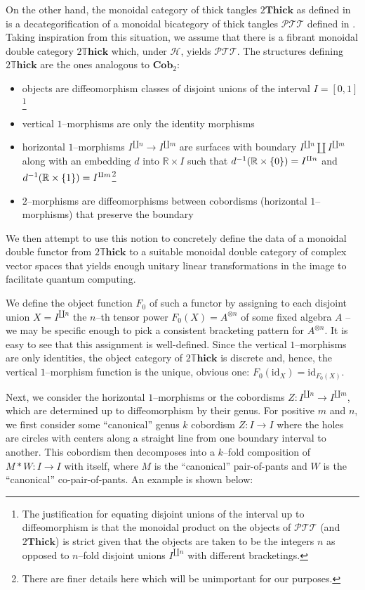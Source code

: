 \documentclass{amsart}
\newcommand{\R}{\mathbb{R}}
\newcommand{\tensor}{\otimes}
\renewcommand{\to}[1][]{\stackrel{#1}{\longrightarrow}}
\newcommand{\id}{\text{id}}
\newcommand{\curly}[1]{\left\{ #1 \right\}}
\newcommand{\set}[2][]{\ifthenelse{\equal{#1}{}}
                                  {\curly{#2}}
                                  {\curly{#1\ \textbf{:}\ #2}}}
\newcommand{\Cob}{\textbf{Cob}}
\newcommand{\Thick}{\textbf{Thick}}
\newcommand{\DThick}{2\mathbb{T}\mathbf{hick}}
\newcommand{\PTT}{\mathcal{PTT}}
\numberwithin{thm}{section}
\theoremstyle{definition}
\begin{document}
On the other hand, the monoidal category of thick tangles $2\Thick$ as defined
in \cite{NonCommTQFT} is a decategorification of a monoidal bicategory of thick
tangles $\PTT$ defined in \cite{NonSemiSimp}. Taking inspiration from this
situation, we assume that there is a fibrant monoidal double category
$\DThick$ which, under $\mathcal{H}$, yields $\PTT$. The structures defining
$\DThick$ are the ones analogous to $\Cob_{2}$:
\begin{itemize}
\setlength{\itemsep}{0pt}
\item objects are diffeomorphism classes of disjoint unions of the interval
$I = [0, 1]$\footnote{The justification for equating disjoint unions of the
interval up to diffeomorphism is that the monoidal product on the objects of
$\PTT$ (and $2\Thick$) is strict given that the objects are taken to be the
integers $n$ as opposed to $n$--fold disjoint unions $I^{\amalg n}$ with
different bracketings.}
\item vertical $1$--morphisms are only the identity morphisms
\item horizontal $1$--morphisms $I^{\amalg n} \to I^{\amalg m}$ are surfaces
with boundary $I^{\amalg n} \amalg I^{\amalg m}$ along with an embedding $d$
into $\R \times I$ such that $d^{-1}(\R \times \set{0}) = I^{\amalg n}$ and
$d^{-1}(\R \times \set{1}) = I^{\amalg m}$\footnote{There are finer details here
which will be unimportant for our purposes.}
\item $2$--morphisms are diffeomorphisms between cobordisms
(horizontal $1$--morphisms) that preserve the boundary
\end{itemize}
We then attempt to use this notion to concretely define the data of a monoidal
double functor from $\DThick$ to a suitable monoidal double category of complex
vector spaces that yields enough unitary linear transformations in the image to
facilitate quantum computing.

We define the object function $F_0$ of such a functor by assigning to each
disjoint union $X = I^{\amalg n}$ the $n$--th tensor power $F_0(X) = A^{\tensor
n}$ of some fixed algebra $A$ -- we may be specific enough to pick a consistent
bracketing pattern for $A^{\tensor n}$. It is easy to see that this assignment
is well-defined. Since the vertical $1$--morphisms are only identities, the
object category of $\DThick$ is discrete and, hence, the vertical $1$--morphism
function is the unique, obvious one: $F_0(\id_X) = \id_{F_0(X)}$.

Next, we consider the horizontal $1$--morphisms or the cobordisms
$Z : I^{\amalg n} \to I^{\amalg m}$, which are determined up to diffeomorphism
by their genus. For positive $m$ and $n$, we first consider some ``canonical''
genus $k$ cobordism $Z : I \to I$ where the holes are circles with centers along
a straight line from one boundary interval to another. This cobordism then
decomposes into a $k$--fold composition of $M * W : I \to I$ with itself, where
$M$ is the ``canonical'' pair-of-pants and $W$ is the ``canonical''
co-pair-of-pants. An example is shown below:
\end{document}
